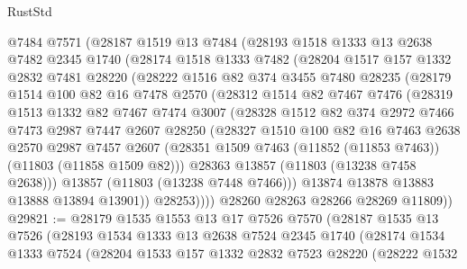 \begin{lexlean}{RustStd}
\begin{coremodule}
    @7484
    @7571
    (@28187
      @1519
      @13
      @7484
      (@28193
        @1518
        @1333
        @13
        @2638
        @7482
        @2345
        @1740
        (@28174
          @1518
          @1333
          @7482
          (@28204
            @1517
            @157
            @1332
            @2832
            @7481
            @28220
            (@28222
              @1516
              @82
              @374
              @3455
              @7480
              @28235
              (@28179
                @1514
                @100
                @82
                @16
                @7478
                @2570
                (@28312
                  @1514
                  @82
                  @7467
                  @7476
                  (@28319
                    @1513
                    @1332
                    @82
                    @7467
                    @7474
                    @3007
                    (@28328
                      @1512
                      @82
                      @374
                      @2972
                      @7466
                      @7473
                      @2987
                      @7447
                      @2607
                      @28250
                      (@28327
                        @1510
                        @100
                        @82
                        @16
                        @7463
                        @2638
                        @2570
                        @2987
                        @7457
                        @2607
                        (@28351 @1509 @7463 (@11852 (@11853 @7463)) (@11803 (@11858 @1509 @82)))
                        @28363
                        @13857
                        (@11803 (@13238 @7458 @2638)))
                      @13857
                      (@11803 (@13238 @7448 @7466)))
                    @13874
                    @13878
                    @13883
                    @13888
                    @13894
                    @13901))
                @28253))))
        @28260
        @28263
        @28266
        @28269
        @11809))
@29821 := @28179
    @1535
    @1553
    @13
    @17
    @7526
    @7570
    (@28187
      @1535
      @13
      @7526
      (@28193
        @1534
        @1333
        @13
        @2638
        @7524
        @2345
        @1740
        (@28174
          @1534
          @1333
          @7524
          (@28204
            @1533
            @157
            @1332
            @2832
            @7523
            @28220
            (@28222
              @1532

\end{coremodule}
\end{lexlean}
